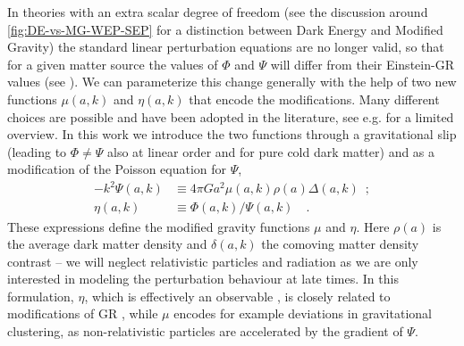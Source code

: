 
In theories with an extra scalar degree of freedom (see the discussion around \cref{fig:DE-vs-MG-WEP-SEP} for a distinction between Dark Energy and Modified Gravity)
the standard linear perturbation equations
are no longer valid, so that for a given matter source the values
of $\Phi$ and $\Psi$ will differ from their Einstein-GR values (see \cite{kunz_phenomenological_2012, amendola_observables_2013}). We can
parameterize this change generally with the help of two new functions $\mu(a,k)$ and $\eta(a,k)$
that encode the modifications. Many different choices are possible
and have been adopted in the literature, see e.g. \cite{planck_collaboration_planck_2016} for a limited overview. 
In this work
we introduce the two functions through a gravitational slip (leading
to $\Phi\neq\Psi$ also at linear order and for pure cold dark matter)
and as a modification of the Poisson equation for $\Psi$, 
\begin{align}
-k^{2}\Psi(a,k) & \equiv  4\pi
Ga^{2}\mu(a,k)\rho(a)\Delta(a,k)\,\,\,;\label{eq:mu_def}\\
\eta(a,k) & \equiv \Phi(a,k)/\Psi(a,k) \quad \label{eq:eta_def}.
\end{align}
These expressions define the modified gravity functions
$\mu$ and $\eta$. Here $\rho(a)$ is the average dark matter density and $\delta(a,k)$
the comoving matter density contrast -- we will neglect relativistic
particles and radiation as we are only interested in modeling the
perturbation behaviour at late times. 
In this formulation, $\eta$,
which is effectively an observable \cite{amendola_observables_2013}, is closely related to
modifications of GR \cite{saltas_anisotropic_2014,sawicki_non-standard_2016}, 
while $\mu$ encodes for example deviations in
gravitational clustering, as non-relativistic particles are accelerated by the gradient of $\Psi$.

